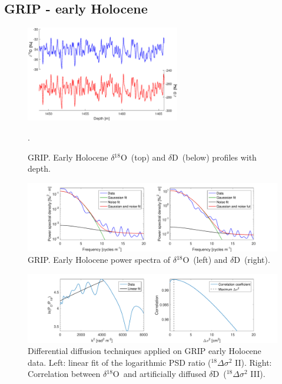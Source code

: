 \documentclass[11pt, draftcls, onecolumn]{IEEEtran} %
\numberwithin{equation}{section}
\numberwithin{table}{section}
\numberwithin{figure}{section}
\newcommand{\delOx}{$\delta{}^{18}\mathrm{O}$}
\newcommand{\delD}{$\delta\mathrm{D}$}
\begin{document}
\begin{appendices}
\clearpage
\subsection{GRIP - early Holocene}

\begin{figure}[H]
	\vspace*{2mm}
	\begin{center}
		\includegraphics[width=0.6\textwidth]{Figure_39}
		\caption{GRIP. Early Holocene \delOx~(top) and \delD~(below) profiles with depth.}  \label{fig:GRIP_early_holo}.
	\end{center}
\end{figure}

\begin{figure}[H]
	\vspace*{2mm}
	\centering
		\includegraphics[width=1\textwidth]{Figure_40}
		\caption{GRIP. Early Holocene power spectra of \delOx~(left) and \delD~(right).}  \label{fig:GRIP_early_fig_1}
\end{figure}

\begin{figure}[H]
	\vspace*{2mm}
	\begin{center}
		\includegraphics[width=1\textwidth]{Figure_41}
		\caption{Differential diffusion techniques applied on GRIP early Holocene data. 
			Left: linear fit of the logarithmic PSD ratio ($^{18}\Delta\sigma^2$ II). Right: 
			Correlation between \delOx~and artificially diffused \delD~($^{18}\Delta\sigma^2$ III).}  \label{fig:GRIP_early_fig_2}
	\end{center}
\end{figure}


\end{appendices}
\end{document}

